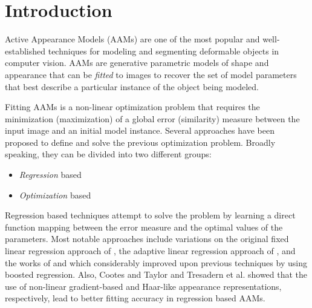 \section{Introduction}
\label{sec:intro}

Active Appearance Models (AAMs) \cite{Cootes2001, Matthews2004} are one of the most popular and well-established techniques for modeling and segmenting deformable objects in computer vision. AAMs are generative parametric models of shape and appearance that can be \emph{fitted} to images to recover the set of model parameters that best describe a particular instance of the object being modeled.

Fitting AAMs is a non-linear optimization problem that requires the  minimization (maximization) of a global error (similarity) measure between the input image and an initial model instance. Several approaches \cite{Cootes2001, Hou2001, Matthews2004, Batur2005, Gross2005, Donner2006, Papandreou2008, Liu2009, Saragih2009, Amberg2009, Tresadern2010, Martins2010, Sauer2011, Tzimiropoulos2013, Kossaifi2014, Antonakos2014} have been proposed to define and solve the previous optimization problem. Broadly speaking, they can be divided into two different groups: 
\begin{itemize}
\item \emph{Regression} based \cite{Cootes2001, Hou2001, Batur2005, Donner2006, Saragih2009, Tresadern2010, Sauer2011}
\item \emph{Optimization} based \cite{Matthews2004, Gross2005, Papandreou2008, Amberg2009, Martins2010, Tzimiropoulos2013, Kossaifi2014}
\end{itemize}

Regression based techniques attempt to solve the problem by learning a direct function mapping between the error measure and the optimal values of the parameters. Most notable approaches include variations on the original \cite{Cootes2001} fixed linear regression approach of \cite{Hou2001, Donner2006}, the adaptive linear regression approach of \cite{Batur2005}, and the works of \cite{Saragih2009} and \cite{Tresadern2010} which considerably improved upon previous techniques by using boosted regression. Also, Cootes and Taylor \cite{Cootes2001b} and Tresadern et al. \cite{Tresadern2010} showed that the use of non-linear gradient-based and Haar-like appearance representations, respectively, lead to better fitting accuracy in regression based AAMs. 

